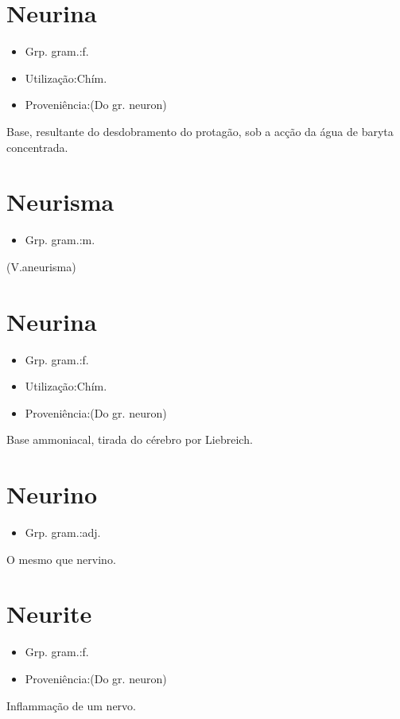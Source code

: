 \section{Neurina}
\begin{itemize}
\item {Grp. gram.:f.}
\end{itemize}
\begin{itemize}
\item {Utilização:Chím.}
\end{itemize}
\begin{itemize}
\item {Proveniência:(Do gr. \textunderscore neuron\textunderscore )}
\end{itemize}
Base, resultante do desdobramento do protagão, sob a acção da água de baryta concentrada.
\section{Neurisma}
\begin{itemize}
\item {Grp. gram.:m.}
\end{itemize}
(V.aneurisma)
\section{Neurina}
\begin{itemize}
\item {Grp. gram.:f.}
\end{itemize}
\begin{itemize}
\item {Utilização:Chím.}
\end{itemize}
\begin{itemize}
\item {Proveniência:(Do gr. \textunderscore neuron\textunderscore )}
\end{itemize}
Base ammoniacal, tirada do cérebro por Liebreich.
\section{Neurino}
\begin{itemize}
\item {Grp. gram.:adj.}
\end{itemize}
O mesmo que \textunderscore nervino\textunderscore .
\section{Neurite}
\begin{itemize}
\item {Grp. gram.:f.}
\end{itemize}
\begin{itemize}
\item {Proveniência:(Do gr. \textunderscore neuron\textunderscore )}
\end{itemize}
Inflammação de um nervo.
